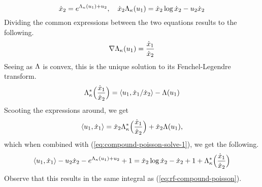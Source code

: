 \begin{example}
\begin{equation}
    \label{eq:compound-poisson-solve-1}
    \dot{x}_2 = e^{\Lambda_\kappa(u_1)+u_2}, \quad \dot{x}_2 \Lambda_\kappa(u_1) = \dot{x}_2\log\dot{x}_2 - u_2\dot{x}_2
  \end{equation}
  Dividing the common expressions between the two equations results to the following.
  \begin{equation*}
    \nabla\Lambda_\kappa(u_1) = \frac{\dot{x}_1}{\dot{x}_2}
  \end{equation*}
  Seeing as $\Lambda$ is convex, this is the unique solution to its Fenchel-Legendre transform.
  \begin{equation*}
    \Lambda_\kappa^*\Big( \frac{\dot{x}_1}{\dot{x}_2} \Big) = {\langle u_1 , \dot{x}_1/\dot{x}_2 \rangle} - \Lambda(u_1)
  \end{equation*}
  Scooting the expressions around, we get
  \begin{equation*}
    {\langle u_1 , \dot{x}_1 \rangle} =  \dot{x}_2\Lambda_\kappa^*\Big( \frac{\dot{x}_1}{\dot{x}_2} \Big) + \dot{x}_2\Lambda(u_1),
  \end{equation*}
  which when combined with (\ref{eq:compound-poisson-solve-1}), we get the following.
  \begin{equation*} 
    {\langle u_1 , \dot{x}_1 \rangle} - u_2\dot{x}_2 - e^{\Lambda_\kappa(u_1) + u_2} + 1 
    = \dot{x}_2 \log \dot{x}_2 - \dot{x}_2 + 1 + \Lambda_\kappa^*\Big(\frac{\dot{x}_1}{\dot{x}_2} \Big)
  \end{equation*}
  Observe that this results in the same integral as (\ref{eq:rf-compound-poisson}).
\end{example}
